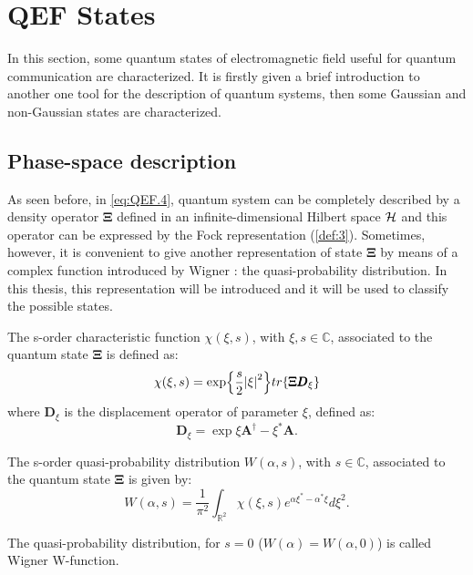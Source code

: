 \section{QEF States}
    In this section, some quantum states of electromagnetic field useful for quantum 
    communication are characterized. It is firstly given a brief introduction to another one
    tool for the description of quantum systems, then some Gaussian and non-Gaussian states 
    are characterized.

    \subsection{Phase-space description}
        As seen before, in \ref{eq:QEF.4}, quantum system can be completely
        described by a density operator $\pmb{\Xi}$ defined in an infinite-dimensional Hilbert space
        $\mathcal{H}$ and this operator can be expressed by the Fock representation (\ref{def:3}).
        Sometimes, however, it is convenient to give another representation of state $\pmb{\Xi}$ by
        means of a complex function introduced by Wigner \cite{Wigner}: the quasi-probability 
        distribution. In this thesis, this representation will be introduced and it will be used to
        classify the possible states.

        \begin{definition}
            The s-order characteristic function $\mathcal{\chi}(\xi,s)$, with $\xi,s\in\mathbb{C}$,
            associated to the quantum state $\pmb{\Xi}$ is defined as:
            \begin{equation}
                \mathcal{\chi}(\xi,s)=\exp{\frac{s}{2}\absolutevalue{\xi}^2}
                tr\{\pmb{\Xi}\pmb{D}_\xi\}
            \end{equation}
            where $\pmb{D}_\xi$ is  the displacement operator of parameter $\xi$, defined as:
            \begin{equation}
                \pmb{D}_\xi=\exp{\xi\pmb{A}^\dagger-\xi^*\pmb{A}}.
            \end{equation}
            \label{def:QEFStates.1}
        \end{definition}
        \begin{definition}
            The s-order quasi-probability distribution $W(\alpha,s)$, with $s\in\mathbb{C}$,
            associated to the quantum state $\mathbf{\Xi}$ is given by:
            \begin{equation}
                W(\alpha,s)=\frac{1}{\pi^2}\int_{\mathbb{R}^2} 
                \mathcal{\chi}(\xi,s)e^{\alpha\xi^*-\alpha^*\xi}d\xi^2.
            \end{equation}
            \label{def:QEFStates.2}
        \end{definition}
        The quasi-probability distribution, for $s=0$ ($W(\alpha)=W(\alpha,0)$) is called 
        Wigner W-function.
        

